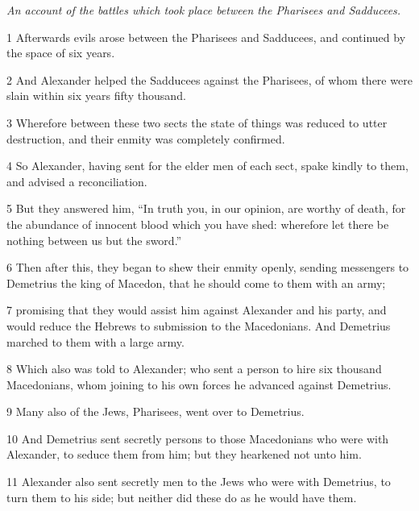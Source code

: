 \par \textit{An account of the battles which took place between the Pharisees and Sadducees.}

\par 1 Afterwards evils arose between the Pharisees and Sadducees, and continued by the space of six years. 

\par 2 And Alexander helped the Sadducees against the Pharisees, of whom there were slain within six years fifty thousand. 

\par 3 Wherefore between these two sects the state of things was reduced to utter destruction, and their enmity was completely confirmed. 

\par 4 So Alexander, having sent for the elder men of each sect, spake kindly to them, and advised a reconciliation. 

\par 5 But they answered him, “In truth you, in our opinion, are worthy of death, for the abundance of innocent blood which you have shed: wherefore let there be nothing between us but the sword.” 

\par 6 Then after this, they began to shew their enmity openly, sending messengers to Demetrius the king of Macedon, that he should come to them with an army; 

\par 7 promising that they would assist him against Alexander and his party, and would reduce the Hebrews to submission to the Macedonians. And Demetrius marched to them with a large army.

\par 8 Which also was told to Alexander; who sent a person to hire six thousand Macedonians, whom joining to his own forces he advanced against Demetrius. 

\par 9 Many also of the Jews, Pharisees, went over to Demetrius. 

\par 10 And Demetrius sent secretly persons to those Macedonians who were with Alexander, to seduce them from him; but they hearkened not unto him. 

\par 11 Alexander also sent secretly men to the Jews who were with Demetrius, to turn them to his side; but neither did these do as he would have them. 

